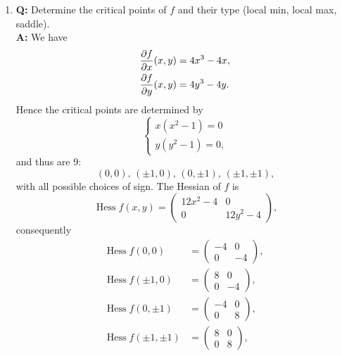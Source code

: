 \documentclass[a4paper,10pt]{article}
\DeclareMathOperator{\Hess}{Hess}
\begin{document}
\begin{enumerate}
    \begin{enumerate}
        \item \textbf{Q:} Determine the critical points of $f$ and their type (local min, local max, saddle).\\
        \textbf{A:} We have
        \begin{align*}
            \pdv{f}{x}(x, y) &= 4x^3 - 4x,\\
            \pdv{f}{y}(x, y) &= 4y^3 - 4y \text{.}
        \end{align*}
        Hence the critical points are determined by
        \[
        \begin{cases}
            x(x^2 - 1) = 0\\
            y(y^2 - 1) = 0 \text{,}
        \end{cases}
        \]
        and thus are 9:
        \[(0, 0),\, (\pm 1, 0),\, (0, \pm 1),\, (\pm 1, \pm 1) \text{,}\]
        with all possible choices of sign. The Hessian of $f$ is
        \[\Hess f(x, y) =
        \begin{pmatrix*}
            12 x^2 - 4 & 0\\
            0 & 12 y^2 - 4
        \end{pmatrix*}
        \text{,}\]
        consequently
        \begin{align*}
            \Hess f(0, 0) &=
            \begin{pmatrix*}
                -4 & 0\\
                0 & -4
            \end{pmatrix*}
            ,\,\\
            \Hess f(\pm 1, 0) &=
            \begin{pmatrix*}
                8 & 0\\
                0 & -4
            \end{pmatrix*}
            ,\,\\
            \Hess f(0, \pm 1) &=
            \begin{pmatrix}
                -4 & 0\\
                0 & 8
            \end{pmatrix}
            ,\,\\
            \Hess f(\pm 1, \pm 1) &=
            \begin{pmatrix*}
                8 & 0\\
                0 & 8
            \end{pmatrix*}
            \text{,}
        \end{align*}

\end{enumerate}
\end{enumerate}
\end{document}
